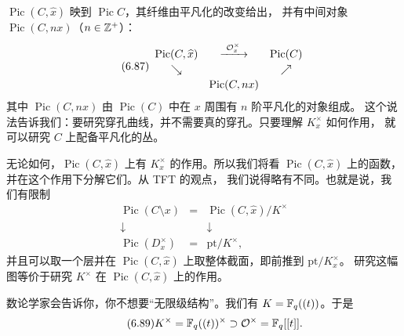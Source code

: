 $\operatorname{Pic}(C,\widehat{x})$ 映到 $\operatorname{Pic}C$，其纤维由平凡化的改变给出，
并有中间对象 $\operatorname{Pic}(C,nx)$（$n\in\mathbb{Z}^{+}$）：
\begin{equation}\tag{6.87}\label{eq:6.87}
\begin{array}{ccc}
\operatorname{Pic}(C,\widehat{x}) & \xrightarrow{\ \mathcal{O}_x^{\times}\ } & \operatorname{Pic}(C)\\[2pt]
\searrow & & \nearrow\\[2pt]
& \operatorname{Pic}(C,nx) &
\end{array}
\end{equation}
其中 $\operatorname{Pic}(C,nx)$ 由 $\operatorname{Pic}(C)$ 中在 $x$ 周围有 $n$ 阶平凡化的对象组成。
这个说法告诉我们：要研究穿孔曲线，并不需要真的穿孔。只要理解 $K_x^{\times}$ 如何作用，
就可以研究 $C$ 上配备平凡化的丛。


无论如何，$\operatorname{Pic}(C,\widehat{x})$ 上有 $K_x^{\times}$ 的作用。所以我们将看
$\operatorname{Pic}(C,\widehat{x})$ 上的函数，并在这个作用下分解它们。从 TFT 的观点，
我们说得略有不同。也就是说，我们有限制
\begin{equation}\tag{6.88}\label{eq:6.88}
\begin{array}{ccc}
\operatorname{Pic}(C\setminus x) & = & \operatorname{Pic}(C,\widehat{x})/K^{\times}\\[2pt]
\downarrow & & \downarrow\\[2pt]
\operatorname{Pic}(D_x^{\times}) & = & \mathrm{pt}/K^{\times},
\end{array}
\end{equation}
并且可以取一个层并在 $\operatorname{Pic}(C,\widehat{x})$ 上取整体截面，即前推到 $\mathrm{pt}/K_x^{\times}$。
研究这幅图等价于研究 $K^{\times}$ 在 $\operatorname{Pic}(C,\widehat{x})$ 上的作用。

数论学家会告诉你，你不想要“无限级结构”。我们有 $K=\mathbb{F}_q((t))$。于是
\begin{equation}\tag{6.89}\label{eq:6.89}
K^{\times}=\mathbb{F}_q((t))^{\times}\supset\mathcal{O}^{\times}=\mathbb{F}_q[[t]].
\end{equation}


